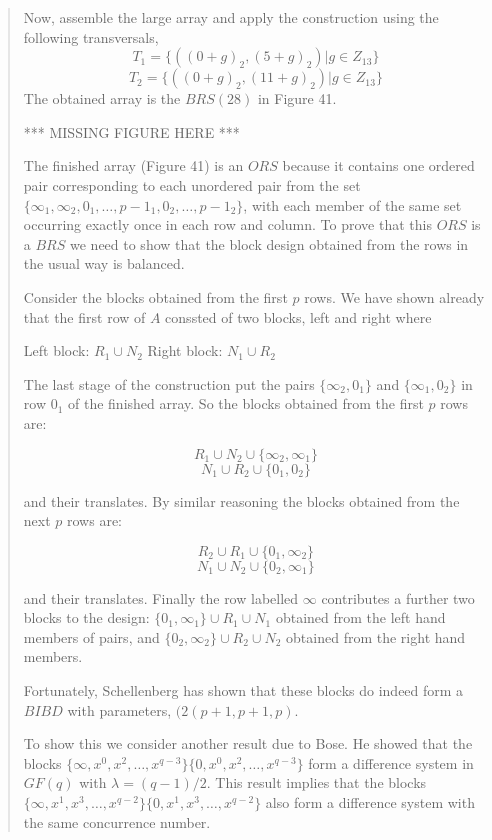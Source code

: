 \documentclass[
  11pt,
  a4paper]{book}
\begin{document}
\begin{quote}
Now, assemble the large array and apply the construction
using the following transversals,
$$T_1 = \{((0 + g)_2, (5 + g)_2)|g \in Z_{13}\}$$
$$T_2 = \{((0 + g)_2, (11 + g)_2)|g \in Z_{13}\}$$
The obtained array is the $BRS(28)$ in Figure 41.

*** MISSING FIGURE HERE ***

The finished array (Figure 41) is an $ORS$ because it
contains one ordered pair corresponding to each unordered
pair from the set
$\{\infty _1, \infty _2, 0_1, \ldots, p - 1_1, 0_2, \ldots, p - 1_2\}$,
with each member of the same set occurring exactly once in
each row and column. To prove that this $ORS$ is a $BRS$ we
need to show that the block design obtained from the rows in
the usual way is balanced.

Consider the blocks obtained from the first $p$ rows. We
have shown already that the first row of $A$ conssted of two
blocks, left and right where

Left block: $R_1 \cup N_2$
Right block: $N_1 \cup R_2$

The last stage of the construction put the pairs
$\{\infty _2, 0_1\}$ and $\{\infty _1,0_2\}$
in row $0_1$ of the finished array. So the blocks obtained
from the first $p$ rows are:

$$R_1 \cup N_2 \cup \{\infty _2, \infty _1 \}$$
$$N_1 \cup R_2 \cup \{0 _1, 0 _2 \}$$

and their translates.  By similar reasoning the blocks
obtained from the next $p$ rows are:

$$R_2 \cup R_1 \cup \{0 _1, \infty _2 \}$$
$$N_1 \cup N_2 \cup \{0 _2, \infty _1 \}$$

and their translates. Finally the row labelled $\infty$
contributes a further two blocks to the design:
$\{0_1, \infty _1\} \cup R_1 \cup N_1$ obtained from the
left hand members of pairs, and
$\{0_2, \infty _2\} \cup R_2 \cup N_2$
obtained from the right hand members.

Fortunately, Schellenberg has shown that these blocks do
indeed form a $BIBD$ with parameters, $(2(p + 1, p + 1, p)$.

To show this we consider another result due to Bose. He
showed that the blocks
$\{\infty, x^0, x^2, \ldots, x^{q - 3}\}\{0, x^0, x^2, \ldots, x^{q - 3}\}$
form a difference system in $GF(q)$ with
$\lambda = (q - 1)/2$.  This result implies that the blocks
$\{\infty, x^1, x^3, \ldots, x^{q - 2}\}\{0, x^1, x^3, \ldots, x^{q - 2}\}$
also form a difference system with the same concurrence
number.
 \end{quote}
\end{document}
